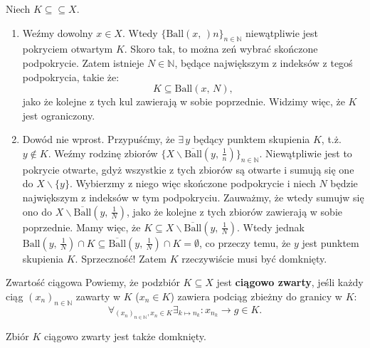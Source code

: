 \documentclass{article}
\numberwithin{defi}{section}
\numberwithin{defi}{section}
\newcommand{\N}{\mathbb{N}}
\newcommand{\ciag}[1]{(#1_{n})_{n \in \N}}
\newcommand{\ball}[2]{\text{Ball}(#1, \, #2)}
\newcommand{\dball}[2]{\overline{\text{Ball}}(#1, \, #2)}
\begin{document}
    \begin{dow}
        Niech $K \subseteq \subseteq X$.
        \begin{enumerate}
            \item Weźmy dowolny $x \in X$. Wtedy $\{ \ball{x}{}n \}_{n \in \N} $ niewątpliwie jest pokryciem otwartym $K$. Skoro tak, to można zeń wybrać skończone podpokrycie. Zatem istnieje $N \in \N$, będące największym z indeksów z tegoś podpokrycia, takie że: \begin{equation*}
                K \subseteq \ball{x}{N},
            \end{equation*} jako że kolejne z tych kul zawierają w sobie poprzednie. Widzimy więc, że $K$ jest ograniczony.

            \item Dowód nie wprost. Przypuśćmy, że $\exists \, y$ będący punktem skupienia $K$, t.ż. $y \notin K$. Weźmy rodzinę zbiorów $\{ X \backslash \dball{y}{\frac{1}{n}} \}_{n \in \N}$. Niewątpliwie jest to pokrycie otwarte, gdyż wszystkie z tych zbiorów są otwarte i sumują się one do $X \backslash \{y\}$. Wybierzmy z niego więc skończone podpokrycie i niech $N$ będzie największym z indeksów w tym podpokryciu. Zauważmy, że wtedy sumujw się ono do $X \backslash \dball{y}{\frac{1}{N}}$, jako że kolejne z tych zbiorów zawierają w sobie poprzednie. Mamy więc, że $K \subseteq X \backslash \dball{y}{\frac{1}{N}}$. Wtedy jednak $ \ball{y}{\frac{1}{N}} \cap K \subseteq \dball{y}{\frac{1}{N}} \cap K = \emptyset$, co przeczy temu, że $y$ jest punktem skupienia $K$. Sprzeczność! Zatem $K$ rzeczywiście musi być domknięty.
        \end{enumerate}
    \end{dow}

    \begin{defr}{Zwartość ciągowa} \label{defr:zwartosc-ciagowa}
        Powiemy, że podzbiór $K \subseteq X$ jest \textbf{ciągowo zwarty}, jeśli każdy ciąg $\ciag{x}$ zawarty w $K$ ($x_n \in K$) zawiera podciąg zbieżny do granicy w $K$: \begin{equation}
            \forall_{\ciag{x}, x_n \in K} \exists_{k \mapsto n_k}: x_{n_k} \to g \in K.
        \end{equation}
    \end{defr}

    \begin{twier}{}\label{twier:ciag-zwarty-domk}
        Zbiór $K$ ciągowo zwarty jest także domknięty.
    \end{twier}
\end{document}
